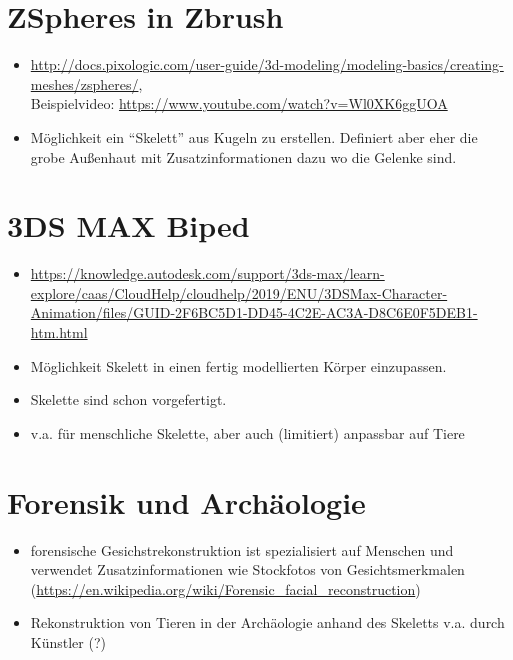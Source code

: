 \section{ZSpheres in Zbrush}

\begin{itemize}
 \item \url{http://docs.pixologic.com/user-guide/3d-modeling/modeling-basics/creating-meshes/zspheres/},\\ Beispielvideo: \url{https://www.youtube.com/watch?v=Wl0XK6ggUOA}
 \item Möglichkeit ein "`Skelett"' aus Kugeln zu erstellen. Definiert aber eher die grobe Außenhaut mit Zusatzinformationen dazu wo die Gelenke sind.
\end{itemize}

\section{3DS MAX Biped}

\begin{itemize}
 \item \url{https://knowledge.autodesk.com/support/3ds-max/learn-explore/caas/CloudHelp/cloudhelp/2019/ENU/3DSMax-Character-Animation/files/GUID-2F6BC5D1-DD45-4C2E-AC3A-D8C6E0F5DEB1-htm.html}
 \item Möglichkeit Skelett in einen fertig modellierten Körper einzupassen. 
 \item Skelette sind schon vorgefertigt.
 \item v.a. für menschliche Skelette, aber auch (limitiert) anpassbar auf Tiere
\end{itemize}

\section{Forensik und Archäologie}

\begin{itemize}
 \item forensische Gesichstrekonstruktion ist spezialisiert auf Menschen und verwendet Zusatzinformationen wie Stockfotos von Gesichtsmerkmalen (\url{https://en.wikipedia.org/wiki/Forensic_facial_reconstruction})
 \item Rekonstruktion von Tieren in der Archäologie anhand des Skeletts v.a. durch Künstler (?)
\end{itemize}


